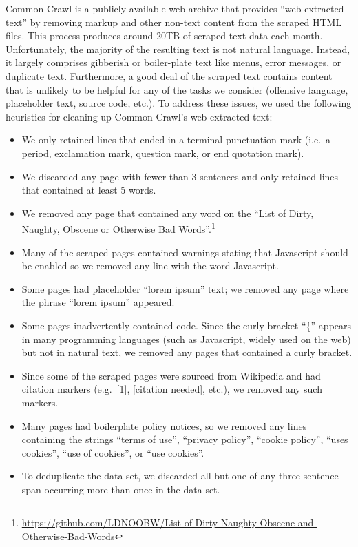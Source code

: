 \documentclass[twoside,11pt]{article}
\begin{document}
Common Crawl is a publicly-available web archive that provides ``web extracted text'' by removing markup and other non-text content from the scraped HTML files.
This process produces around 20TB of scraped text data each month.
Unfortunately, the majority of the resulting text is not natural language.
Instead, it largely comprises gibberish or boiler-plate text like menus, error messages, or duplicate text.
Furthermore, a good deal of the scraped text contains content that is unlikely to be helpful for any of the tasks we consider (offensive language, placeholder text, source code, etc.).
To address these issues, we used the following heuristics for cleaning up Common Crawl's web extracted text:
\begin{itemize}
  \item We only retained lines that ended in a terminal punctuation mark (i.e.\ a period, exclamation mark, question mark, or end quotation mark).
  \item We discarded any page with fewer than 3 sentences and only retained lines that contained at least 5 words.
  \item We removed any page that contained any word on the ``List of Dirty, Naughty, Obscene or Otherwise Bad Words''.\footnote{\url{https://github.com/LDNOOBW/List-of-Dirty-Naughty-Obscene-and-Otherwise-Bad-Words}}
  \item Many of the scraped pages contained warnings stating that Javascript should be enabled so we removed any line with the word Javascript.
  \item Some pages had placeholder ``lorem ipsum'' text; we removed any page where the phrase ``lorem ipsum'' appeared.
  \item Some pages inadvertently contained code. Since the curly bracket ``\{'' appears in many programming languages (such as Javascript, widely used on the web) but not in natural text, we removed any pages that contained a curly bracket.
  \item Since some of the scraped pages were sourced from Wikipedia and had citation markers (e.g.\ [1], [citation needed], etc.), we removed any such markers.
  \item Many pages had boilerplate policy notices, so we removed any lines containing the strings ``terms of use'', ``privacy policy'', ``cookie policy'', ``uses cookies'', ``use of cookies'', or ``use cookies''.
  \item To deduplicate the data set, we discarded all but one of any three-sentence span occurring more than once in the data set.
\end{itemize}
\end{document}
